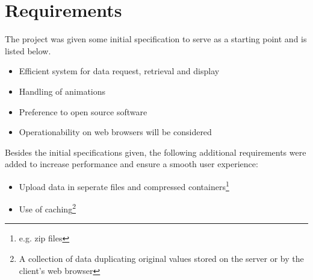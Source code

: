 \chapter{Requirements}
The project was given some initial specification to serve as a starting point and is listed below.
\begin{itemize}
\item Efficient system for data request, retrieval and display
\item Handling of animations
\item Preference to open source software 
\item Operationability on web browsers will be considered
\end{itemize}

Besides the initial specifications given, the following additional requirements were added to increase performance and ensure a smooth user experience:
\begin{itemize}
\item Upload data in seperate files and compressed containers\footnote{e.g. zip files}
\item Use of caching\footnote{A collection of data duplicating original values stored on the server or by the client's web browser}
\end{itemize}